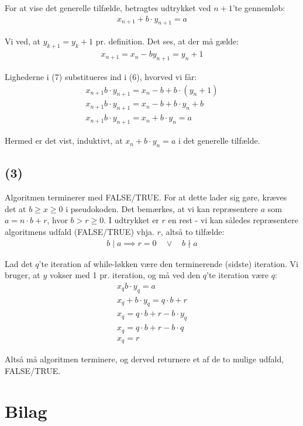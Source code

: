 \documentclass[a4paper,10pt]{article}
\begin{document}
For at vise det generelle tilfælde, betragtes udtrykket ved $n+1$'te gennemløb:
\begin{equation}
\begin{aligned}	
x_{n+1} + b \cdot y_{n+1} = a
\end{aligned}
\end{equation}

Vi ved, at $y_{k+1} = y_{k} + 1$ pr. definition. Det ses, at der må gælde:
\begin{equation}
\begin{aligned}	
x_{n+1} = x_{n} - b
y_{n+1} = y_{n} + 1
\end{aligned}
\end{equation}

Lighederne i (7) substitueres ind i (6), hvorved vi får:
\begin{equation}
\begin{aligned}	
x_{n+1} b \cdot y_{n+1} = x_{n} - b + b \cdot (y_{n} + 1) \\
x_{n+1} b \cdot y_{n+1} = x_{n} - b + b \cdot y_{n} + b \\
x_{n+1} b \cdot y_{n+1} = x_{n} + b \cdot y_{n} = a
\end{aligned}
\end{equation}

Hermed er det vist, induktivt, at $x_{n} + b\cdot y_{n} = a$ i det generelle tilfælde.

\subsection*{(3)}

Algoritmen terminerer med FALSE/TRUE. For at dette lader sig gøre, kræves det at $b \geq x \geq 0$ i pseudokoden. Det bemærkes, at vi kan repræsentere $a$ som $ a = n \cdot b + r$, hvor $b > r \geq 0$. I udtrykket er $r$ en rest - vi kan således repræsentere algoritmens udfald (FALSE/TRUE) vhja. $r$, altså to tilfælde: 
\begin{equation}
\begin{aligned}	
b\mid a \implies r = 0 \quad \vee \quad b \nmid a
\end{aligned}
\end{equation}

Lad det $q$'te iteration af while-løkken være den terminerende (sidste) iteration. Vi bruger, at $y$ vokser med 1 pr. iteration, og må ved den $q$'te iteration være $q$:
\begin{equation}
\begin{aligned}	
x_{q}  b \cdot y_{q} = a\\
x_{q} + b \cdot y_{q} = q \cdot b + r \\
x_{q} = q \cdot b + r - b \cdot y_{q} \\
x_{q} = q \cdot b + r - b \cdot q \\
x_{q} = r
\end{aligned}
\end{equation}

Altså må algoritmen terminere, og derved returnere et af de to mulige udfald, FALSE/TRUE.

\newpage

\section*{Bilag}

\end{document}
